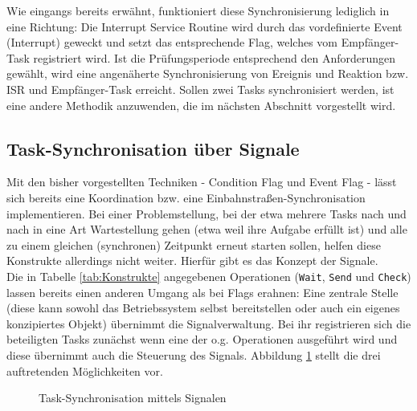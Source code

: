\documentclass{llncs}
\begin{document}
Wie eingangs bereits erwähnt, funktioniert diese Synchronisierung lediglich in eine Richtung: Die Interrupt Service Routine wird durch das vordefinierte Event (Interrupt) geweckt und setzt das entsprechende Flag, welches vom Empfänger-Task registriert wird. Ist die Prüfungsperiode entsprechend den Anforderungen gewählt, wird eine angenäherte Synchronisierung von Ereignis und Reaktion bzw. ISR und Empfänger-Task erreicht. Sollen zwei Tasks synchronisiert werden, ist eine andere Methodik anzuwenden, die im nächsten Abschnitt vorgestellt wird.

\subsection{Task-Synchronisation über Signale}
\label{subsec:Task_Synchronisation_Signale}
Mit den bisher vorgestellten Techniken - Condition Flag und Event Flag - lässt sich bereits eine Koordination bzw. eine Einbahnstraßen-Synchronisation implementieren. Bei einer Problemstellung, bei der etwa mehrere Tasks nach und nach in eine Art Wartestellung gehen (etwa weil ihre Aufgabe erfüllt ist) und alle zu einem gleichen (synchronen) Zeitpunkt erneut starten sollen, helfen diese Konstrukte allerdings nicht weiter. Hierfür gibt es das Konzept der Signale.\\

Die in Tabelle \ref{tab:Konstrukte} angegebenen Operationen (\texttt{Wait}, \texttt{Send} und \texttt{Check}) lassen bereits einen anderen Umgang als bei Flags erahnen: Eine zentrale Stelle (diese kann sowohl das Betriebssystem selbst bereitstellen oder auch ein eigenes konzipiertes Objekt) übernimmt die Signalverwaltung. Bei ihr registrieren sich die beteiligten Tasks zunächst wenn eine der o.g. Operationen ausgeführt wird und diese übernimmt auch die Steuerung des Signals. Abbildung \ref{fig:Signale_gesamt} stellt die drei auftretenden Möglichkeiten vor.

\begin{figure}[h]
	\centering
	\begin{subfigure}{.40\columnwidth} %
		\def\svgwidth{\columnwidth}
		
	\end{subfigure}
	\caption{\label{fig:Signale_gesamt}Task-Synchronisation mittels Signalen \autocite[vgl.][90]{Cooling2017}}
\end{figure}
\end{document}
